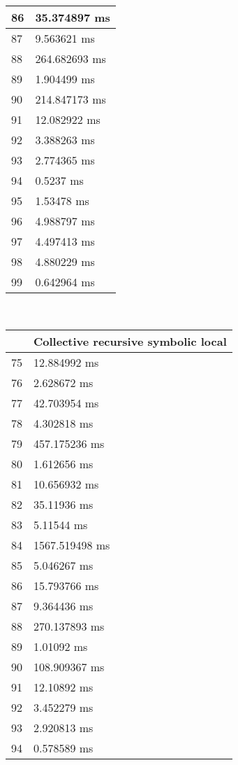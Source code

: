 \begin{multicols}{2}
\begin{tabular}{|l|l|}
		86 & 35.374897 ms \\ \hline
		87 & 9.563621 ms \\ \hline
		88 & 264.682693 ms \\ \hline
		89 & 1.904499 ms \\ \hline
		90 & 214.847173 ms \\ \hline
		91 & 12.082922 ms \\ \hline
		92 & 3.388263 ms \\ \hline
		93 & 2.774365 ms \\ \hline
		94 & 0.5237 ms \\ \hline
		95 & 1.53478 ms \\ \hline
		96 & 4.988797 ms \\ \hline
		97 & 4.497413 ms \\ \hline
		98 & 4.880229 ms \\ \hline
		99 & 0.642964 ms \\ \hline
	\end{tabular}\\
	\begin{tabular}{|l|l|}
		\hline
		& Collective recursive symbolic local \\ \hline
		75 & 12.884992 ms \\ \hline
		76 & 2.628672 ms \\ \hline
		77 & 42.703954 ms \\ \hline
		78 & 4.302818 ms \\ \hline
		79 & 457.175236 ms \\ \hline
		80 & 1.612656 ms \\ \hline
		81 & 10.656932 ms \\ \hline
		82 & 35.11936 ms \\ \hline
		83 & 5.11544 ms \\ \hline
		84 & 1567.519498 ms \\ \hline
		85 & 5.046267 ms \\ \hline
		86 & 15.793766 ms \\ \hline
		87 & 9.364436 ms \\ \hline
		88 & 270.137893 ms \\ \hline
		89 & 1.01092 ms \\ \hline
		90 & 108.909367 ms \\ \hline
		91 & 12.10892 ms \\ \hline
		92 & 3.452279 ms \\ \hline
		93 & 2.920813 ms \\ \hline
		94 & 0.578589 ms \\ \hline

\end{tabular}
\end{multicols}
